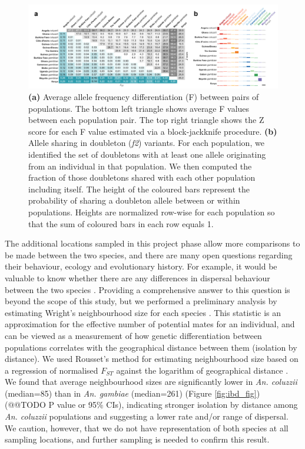 \documentclass[a4paper,11pt,abstracton,hidelinks]{scrartcl}
\begin{document}
\begin{figure}[H]
	\begin{center}
		\includegraphics*[width=6.3in]{artwork/structure_composite.pdf}
	\end{center}
	\caption{\textbf{(a)} Average allele frequency differentiation (F) between pairs of populations. The bottom left triangle shows average F values between each population pair. The top right triangle shows the Z score for each F value estimated via a block-jackknife procedure. \textbf{(b)} Allele sharing in doubleton (\textit{f2}) variants. For each population, we identified the set of doubletons with at least one allele originating from an individual in that population. We then computed the fraction of those doubletons shared with each other population including itself. The height of the coloured bars represent the probability of sharing a doubleton allele between or within populations. Heights are normalized row-wise for each population so that the sum of coloured bars in each row equals 1.
}
	\label{fstdbl}
\end{figure}


%
The additional locations sampled in this project phase allow more comparisons to be made between the two species, and there are many open questions regarding their behaviour, ecology and evolutionary history.
%
For example, it would be valuable to know whether there are any differences in dispersal behaviour between the two species \cite{dao2014, epopa2017, north2019}. 
%
Providing a comprehensive answer to this question is beyond the scope of this study, but we performed a preliminary analysis by estimating Wright's neighbourhood size for each species \cite{wright1946}.
%
This statistic is an approximation for the effective number of potential mates for an individual, and can be viewed as a measurement of how genetic differentiation between populations correlates with the geographical distance between them (isolation by distance).
%
We used Rousset's method for estimating neighbourhood size based on a regression of normalised $F_{ST}$ against the logarithm of geographical distance \cite{rousset1997genetic}.
%
We found that average neighbourhood sizes are significantly lower in \textit{An. coluzzii} (median=85) than in \textit{An. gambiae} (median=261) (Figure \ref{fig:ibd_fig}) (@@TODO P value or 95\% CIs), indicating stronger isolation by distance among \textit{An. coluzzii} populations and suggesting a lower rate and/or range of dispersal.
%
We caution, however, that we do not have representation of both species at all sampling locations, and further sampling is needed to confirm this result.
\end{document}
